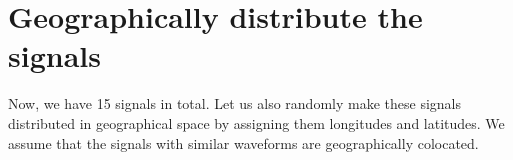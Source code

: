 \documentclass[letterpaper,10pt,english]{sphinxmanual}
\begin{document}
\noindent{}


\section{Geographically distribute the signals}
\label{\detokenize{usage/clustering_analysis_examples:geographically-distribute-the-signals}}
\sphinxAtStartPar
Now, we have 15 signals in total. Let us also randomly make these signals distributed in geographical space by assigning them longitudes and latitudes. We assume that the signals with similar waveforms are geographically co\sphinxhyphen{}located.

\begin{sphinxVerbatim}[commandchars=\\\{\}]
       
       
       
       
       
\end{sphinxVerbatim}
\end{document}
